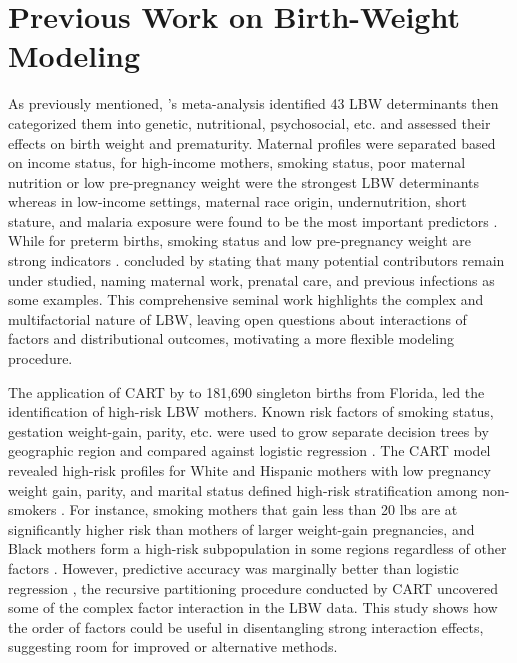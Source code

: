 \section{Previous Work on Birth-Weight Modeling}
\label{sec:ch2-previous-work}

As previously mentioned, \textcite{kramer1987}'s meta-analysis identified 43 LBW determinants then categorized them into genetic, nutritional, psychosocial, etc. and assessed their effects on birth weight and prematurity. Maternal profiles were separated based on income status, for high-income mothers, smoking status, poor maternal nutrition or low pre-pregnancy weight were the strongest LBW determinants whereas in low-income settings, maternal race origin, undernutrition, short stature, and malaria exposure were found to be the most important predictors \parencite{kramer1987}. While for preterm births, smoking status and low pre-pregnancy weight are strong indicators \parencite{kramer1987}.  \textcite{kramer1987} concluded by stating that many potential contributors remain under studied, naming maternal work, prenatal care, and previous infections as some examples. This comprehensive seminal work highlights the complex and multifactorial nature of LBW, leaving open questions about interactions of factors and distributional outcomes, motivating a more flexible modeling procedure.

The application of CART by \textcite{KITSANTAS2006275} to 181,690 singleton births from Florida, led the identification of high-risk LBW mothers. Known risk factors of smoking status, gestation weight-gain, parity, etc. were used to grow separate decision trees by geographic region and compared against logistic regression \parencite{KITSANTAS2006275}. The CART model revealed high-risk profiles for White and Hispanic mothers with low pregnancy weight gain, parity, and marital status defined high-risk stratification among non-smokers \parencite{KITSANTAS2006275}. For instance, smoking mothers that gain less than 20 lbs are at significantly higher risk than mothers of larger weight-gain pregnancies, and Black mothers form a high-risk subpopulation in some regions regardless of other factors \parencite{KITSANTAS2006275}. However, predictive accuracy was marginally better than logistic regression \parencite{KITSANTAS2006275}, the recursive partitioning procedure conducted by CART uncovered some of the complex factor interaction in the LBW data. This study shows how the order of factors could be useful in disentangling strong interaction effects, suggesting room for improved or alternative methods. 


